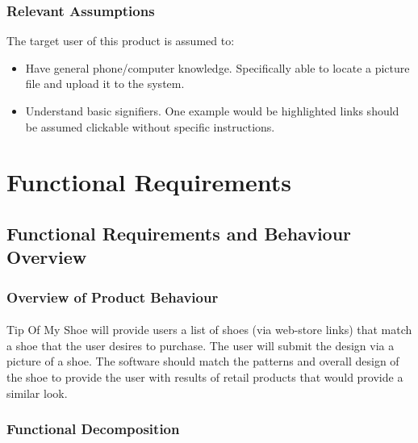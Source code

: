 \documentclass[12pt, titlepage]{article}
\begin{document}


\subsubsection{Relevant Assumptions}

The target user of this product is assumed to:
\begin{itemize}
\item Have general phone/computer knowledge. Specifically able to locate a picture file and upload it to the system.
\item Understand basic signifiers. One example would be highlighted links should be assumed clickable without specific instructions.
\end{itemize}

\section{Functional Requirements}


\subsection{Functional Requirements and Behaviour Overview}

\subsubsection{Overview of Product Behaviour}
\paragraph{} Tip Of My Shoe will provide users a list of shoes (via web-store links) that match a shoe that the user desires to purchase. The user will submit the design via a picture of a shoe. The software should match the patterns and overall design of the shoe to provide the user with results of retail products that would provide a similar look.


\subsubsection{Functional Decomposition}
\end{document}
